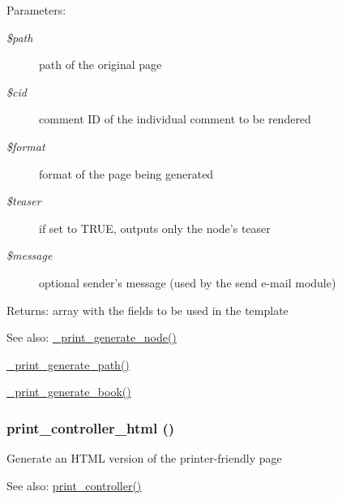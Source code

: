 \begin{Desc}
\item[Parameters:]
\begin{description}
\item[{\em \$path}]path of the original page \item[{\em \$cid}]comment ID of the individual comment to be rendered \item[{\em \$format}]format of the page being generated \item[{\em \$teaser}]if set to TRUE, outputs only the node's teaser \item[{\em \$message}]optional sender's message (used by the send e-mail module) \end{description}
\end{Desc}
\begin{Desc}
\item[Returns:]array with the fields to be used in the template \end{Desc}
\begin{Desc}
\item[See also:]\hyperlink{print_8pages_8inc_c1145058f38f60736aadfe1b67ad9e12}{\_\-print\_\-generate\_\-node()} 

\hyperlink{print_8pages_8inc_034f39dad1e6de6b874b38bc9ba6df44}{\_\-print\_\-generate\_\-path()} 

\hyperlink{print_8pages_8inc_6081aae9c9ef906ea6d53fd2eaf3e97c}{\_\-print\_\-generate\_\-book()} \end{Desc}
\hypertarget{print_8pages_8inc_d0694de8f2f026781bf81915d7921512}{
\subsubsection[{print\_\-controller\_\-html}]{\setlength{\rightskip}{0pt plus 5cm}print\_\-controller\_\-html ()}}
\label{print_8pages_8inc_d0694de8f2f026781bf81915d7921512}


Generate an HTML version of the printer-friendly page

\begin{Desc}
\item[See also:]\hyperlink{print_8pages_8inc_aef613d2eb4448233d3600d0d7259e95}{print\_\-controller()} \end{Desc}
